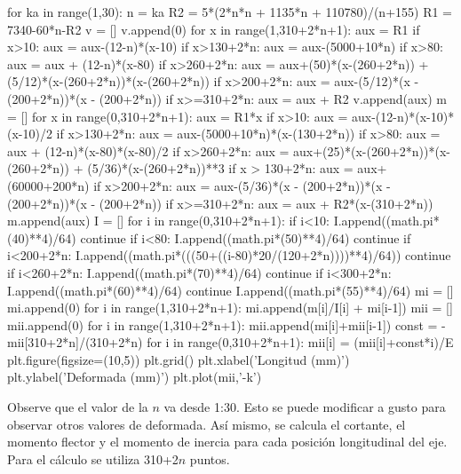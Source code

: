 \documentclass[a4paper,11pt]{report}
\begin{document}
\begin{pyglist}[language=python,caption={Cálculo de la flecha},style=tango]
for ka in range(1,30):
    n = ka
    R2 = 5*(2*n*n + 1135*n + 110780)/(n+155)
    R1 = 7340-60*n-R2
    v = []
    v.append(0)
    for x in range(1,310+2*n+1):
        aux = R1
        if x>10:
            aux = aux-(12-n)*(x-10)
        if x>130+2*n:
            aux = aux-(5000+10*n)
        if x>80:
            aux = aux + (12-n)*(x-80)
        if x>260+2*n:
            aux = aux+(50)*(x-(260+2*n)) + (5/12)*(x-(260+2*n))*(x-(260+2*n))
        if x>200+2*n:
            aux = aux-(5/12)*(x - (200+2*n))*(x - (200+2*n))
        if x>=310+2*n:
            aux = aux + R2
        v.append(aux)
    m = []
    for x in range(0,310+2*n+1):
        aux = R1*x
        if x>10:
            aux = aux-(12-n)*(x-10)*(x-10)/2
        if x>130+2*n:
            aux = aux-(5000+10*n)*(x-(130+2*n))
        if x>80:
            aux = aux + (12-n)*(x-80)*(x-80)/2
        if x>260+2*n:
            aux = aux+(25)*(x-(260+2*n))*(x-(260+2*n)) + (5/36)*(x-(260+2*n))**3
        if x > 130+2*n:
            aux = aux+(60000+200*n)
        if x>200+2*n:
            aux = aux-(5/36)*(x - (200+2*n))*(x - (200+2*n))*(x - (200+2*n))
        if x>=310+2*n:
            aux = aux + R2*(x-(310+2*n))
        m.append(aux)
    I = []
    for i in range(0,310+2*n+1):
        if i<10:
            I.append((math.pi*(40)**4)/64)
            continue
        if i<80:
            I.append((math.pi*(50)**4)/64)
            continue
        if i<200+2*n:
            I.append((math.pi*(((50+((i-80)*20/(120+2*n))))**4)/64))
            continue
        if i<260+2*n:
            I.append((math.pi*(70)**4)/64)
            continue
        if i<300+2*n:
            I.append((math.pi*(60)**4)/64)
            continue
        I.append((math.pi*(55)**4)/64)
    mi = []
    mi.append(0)
    for i in range(1,310+2*n+1):
        mi.append(m[i]/I[i] + mi[i-1])
    mii = []
    mii.append(0)
    for i in range(1,310+2*n+1):
        mii.append(mi[i]+mii[i-1])
    const = -mii[310+2*n]/(310+2*n)
    for i in range(0,310+2*n+1):
        mii[i] = (mii[i]+const*i)/E
    plt.figure(figsize=(10,5))
    plt.grid()
    plt.xlabel('Longitud (mm)')
    plt.ylabel('Deformada (mm)')
    plt.plot(mii,'-k')
\end{pyglist}
Observe que el valor de la $n$ va desde 1:30. Esto se puede modificar a gusto para observar otros valores de deformada. Así mismo, se calcula el cortante, el momento flector y el momento de inercia para cada posición longitudinal del eje. Para el cálculo se utiliza 310+2$n$ puntos.\\
\end{document}
